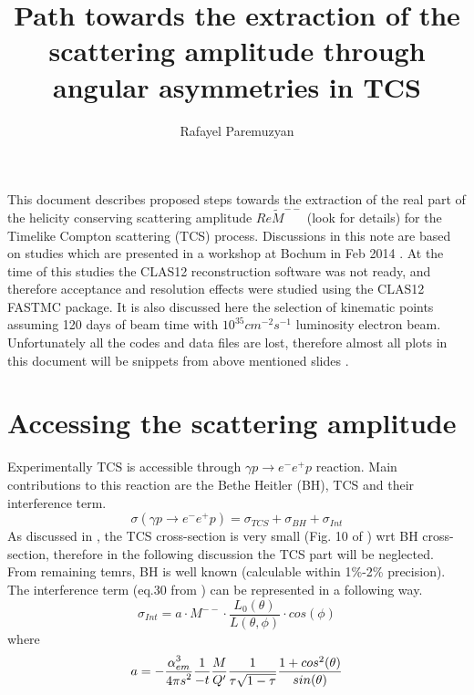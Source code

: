 \documentclass[letterpaper,12pt]{article}
\title{Path towards the extraction of the scattering amplitude through angular asymmetries in TCS}
\author{Rafayel Paremuzyan}
\def \rarr {\rightarrow}
\def\dfrac#1#2{\displaystyle{{#1}\over{#2}}}
\def \dstl {\displaystyle}
\begin{document}
 
 \maketitle
 
 This document describes proposed steps towards the extraction of the real part of the helicity conserving scattering amplitude $Re\tilde{M}^{--}$ (look \cite{Berger:2001xd} for details) for the Timelike Compton scattering (TCS) process. Discussions in this note are based on studies which are presented in a workshop at Bochum in Feb 2014 \cite{Bochum_TCS}. At the time of this studies the CLAS12 reconstruction software was not ready, and therefore acceptance and resolution effects were studied using the CLAS12 FASTMC package. It is also discussed here the selection of kinematic points assuming 120 days of beam time with $10^{35}cm^{-2}s^{-1}$ luminosity electron beam. 
 Unfortunately all the codes and data files are lost, therefore almost all plots in this document will be snippets from above mentioned slides \cite{Bochum_TCS}.
 
 \section{Accessing the scattering amplitude} \label{sec:Access_amplitude}
 Experimentally TCS is accessible through $\gamma p \rarr e^{-}e^{+}p$ reaction. Main contributions to this reaction are the Bethe Heitler (BH), TCS and their interference term.
 \begin{equation}
 \sigma(\gamma p \rarr e^{-}e^{+}p) = \sigma_{TCS} + \sigma_{BH} + \sigma_{Int}
 \end{equation}
As discussed in \cite{Berger:2001xd}, the TCS cross-section is very small (Fig. 10 of \cite{Berger:2001xd}) wrt BH cross-section, therefore in the following discussion the TCS part will be neglected. From remaining temrs, BH is well known (calculable within 1\%-2\% precision). The interference term (eq.30 from \cite{Berger:2001xd})
can be represented in a following way.
\begin{equation}
 \sigma_{Int} = a\cdot M^{--} \cdot \frac{L_{0}(\theta)}{L(\theta, \phi)} \cdot cos(\phi)
\end{equation}
where 
\begin{equation}
a = - \frac{\dstl \alpha_{em}^{3}}{\dstl 4\pi s^{2}} \dfrac{1}{-t}\dfrac{M}{Q^{\prime}}
\dfrac{1}{\tau\sqrt{1-\tau}}\dfrac{1 + cos^{2}(\theta)}{sin(\theta)}
\end{equation}
 
\end{document}
